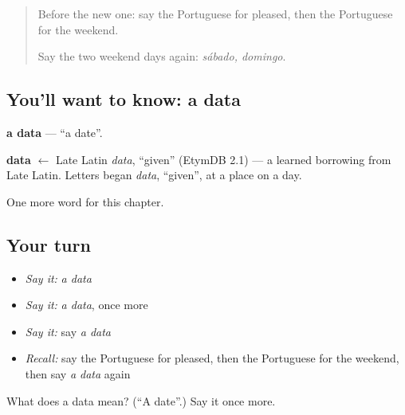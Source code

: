 \label{lesson:PT-C128-data}



\begin{quote}
Before the new one: say the Portuguese for pleased, then the Portuguese for the weekend.

Say the two weekend days again: \emph{sábado, domingo}.
\end{quote}

\subsection*{You'll want to know: a data}
\textbf{a data} — \textquotedblleft{}a date\textquotedblright{}.

\begin{cousinweb}
\textbf{data} $\leftarrow$ Late Latin \emph{data}, \textquotedblleft{}given\textquotedblright{} (EtymDB 2.1) — a learned borrowing from Late Latin. Letters began \emph{data}, \textquotedblleft{}given\textquotedblright{}, at a place on a day.
\end{cousinweb}

\begin{grammarlens}[title={What you've built}]
One more word for this chapter.
\end{grammarlens}

\subsection*{Your turn}
\begin{itemize}
\raggedright
  \item \emph{Say it:} \emph{a data}
  \item \emph{Say it:} \emph{a data}, once more
  \item \emph{Say it:} say \emph{a data}
  \item \emph{Recall:} say the Portuguese for pleased, then the Portuguese for the weekend, then say \emph{a data} again
\end{itemize}

\begin{tcolorbox}[breakable,colback=teal!4,colframe=teal!35!black,title={Before you move on}]
What does a data mean? (\textquotedblleft{}A date\textquotedblright{}.) Say it once more.
\end{tcolorbox}
